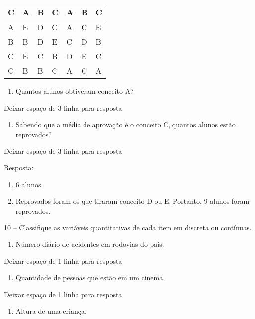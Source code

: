 \begin{longtable}[]{@{}lllllll@{}}
\toprule
C & A & B & C & A & B & C\tabularnewline
\midrule
\endhead
A & E & D & C & A & C & E\tabularnewline
B & B & D & E & C & D & B\tabularnewline
C & E & C & B & D & E & C\tabularnewline
C & B & B & C & A & C & A\tabularnewline
\bottomrule
\end{longtable}

\begin{enumerate}
\def\labelenumi{\alph{enumi})}
\item
  Quantos alunos obtiveram conceito A?
\end{enumerate}

Deixar espaço de 3 linha para resposta

\begin{enumerate}
\def\labelenumi{\alph{enumi})}
\item
  Sabendo que a média de aprovação é o conceito C, quantos alunos estão
  reprovados?
\end{enumerate}

Deixar espaço de 3 linha para resposta

Resposta:

\begin{enumerate}
\def\labelenumi{\alph{enumi})}
\item
  6 alunos
\item
  Reprovados foram os que tiraram conceito D ou E. Portanto, 9 alunos
  foram reprovados.
\end{enumerate}

10 -- Classifique as variáveis quantitativas de cada item em discreta ou
contínuas.

\begin{enumerate}
\def\labelenumi{\alph{enumi})}
\item
  Número diário de acidentes em rodovias do país.
\end{enumerate}

Deixar espaço de 1 linha para resposta

\begin{enumerate}
\def\labelenumi{\alph{enumi})}
\item
  Quantidade de pessoas que estão em um cinema.
\end{enumerate}

Deixar espaço de 1 linha para resposta

\begin{enumerate}
\def\labelenumi{\alph{enumi})}
\item
  Altura de uma criança.
\end{enumerate}

